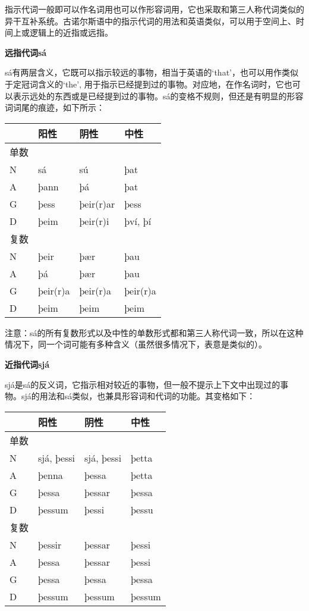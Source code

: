 指示代词一般即可以作名词用也可以作形容词用，它也采取和第三人称代词类似的异干互补系统。古诺尔斯语中的指示代词的用法和英语类似，可以用于空间上、时间上或逻辑上的近指或远指。

\textbf{远指代词sá}

sá有两层含义，它既可以指示较远的事物，相当于英语的`that‌'，也可以用作类似于定冠词含义的`the‌',
用于指示已经提到过的事物。对应地，在作名词时，它也可以表示远处的东西或是已经提到过的事物。sá的变格不规则，但还是有明显的形容词词尾的痕迹，如下所示：

\begin{longtable}{llll}
  \toprule
     & 阳性       & 阴性        & 中性       \\
  \midrule
  \endhead
  \bottomrule
  \endfoot
  单数 &          &           &          \\
  N  & sá       & sú        & þat      \\
  A  & þann     & þá        & þat      \\
  G  & þess     & þeir(r)ar & þess     \\
  D  & þeim     & þeir(r)i  & því, þí  \\
  复数 &          &           &          \\
  N  & þeir     & þær       & þau      \\
  A  & þá       & þær       & þau      \\
  G  & þeir(r)a & þeir(r)a  & þeir(r)a \\
  D  & þeim     & þeim      & þeim     \\
\end{longtable}

注意：sá的所有复数形式以及中性的单数形式都和第三人称代词一致，所以在这种情况下，同一个词可能有多种含义（虽然很多情况下，表意是类似的）。

\textbf{近指代词sjá}

sjá是sá的反义词，它指示相对较近的事物，但一般不提示上下文中出现过的事物。sjá的用法和sá类似，也兼具形容词和代词的功能。其变格如下：

\begin{longtable}{llll}
  \toprule
     & 阳性         & 阴性         & 中性     \\
  \midrule
  \endhead
  \bottomrule
  \endfoot
  单数 &            &            &        \\
  N  & sjá, þessi & sjá, þessi & þetta  \\
  A  & þenna      & þessa      & þetta  \\
  G  & þessa      & þessar     & þessa  \\
  D  & þessum     & þessi      & þessu  \\
  复数 &            &            &        \\
  N  & þessir     & þessar     & þessi  \\
  A  & þessa      & þessar     & þessi  \\
  G  & þessa      & þessa      & þessa  \\
  D  & þessum     & þessum     & þessum \\
\end{longtable}

